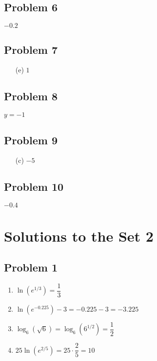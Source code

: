 \documentclass[12pt]{article}
\begin{document}
\subsection*{Problem 6}
\( -0.2\)

\subsection*{Problem 7}
\begin{enumerate}
    \item[(e)] \(1\)
\end{enumerate}

\subsection*{Problem 8}
\( y = -1 \)

\subsection*{Problem 9}
\begin{enumerate}
    \item[(c)] \(-5\)
\end{enumerate}


\subsection*{Problem 10}
\( -0.4 \)

\section*{Solutions to the Set 2}

\subsection*{Problem 1}
\begin{enumerate}[label=(\alph*)]
    \item $\ln(e^{1/3}) = \dfrac{1}{3}$
    
    \item $\ln(e^{-0.225}) - 3 = -0.225 - 3 = -3.225$
    
    \item $\log_6(\sqrt{6}) = \log_6(6^{1/2}) = \dfrac{1}{2}$
    
    \item $25\ln(e^{2/5}) = 25 \cdot \dfrac{2}{5} = 10$
\end{enumerate}
\end{document}
